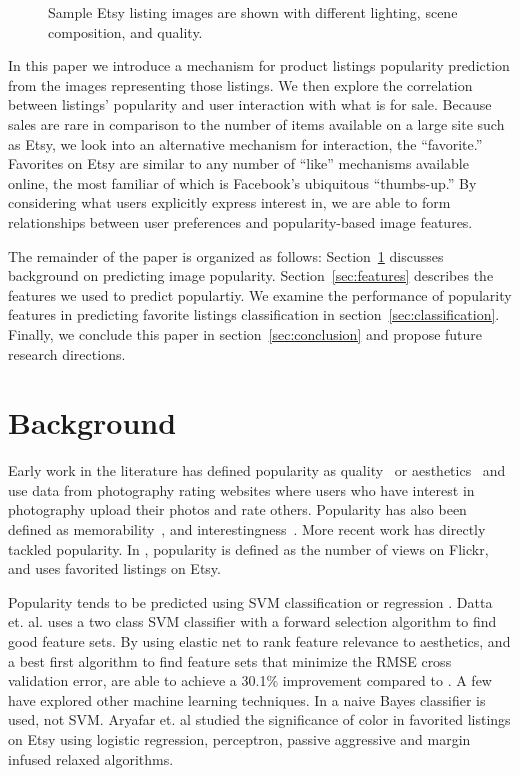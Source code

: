 \documentclass[conference,a4paper]{IEEEtran}
\begin{document}
\begin{figure}
  \caption{
  Sample Etsy listing images are shown with different lighting, scene composition, and quality.
  }
  \label{fig:etsylistings}
\end{figure}


In this paper we introduce a mechanism for product listings popularity prediction from the images representing those listings. We then explore the correlation between listings' popularity and user interaction with what is for sale. Because sales are rare in comparison to the number of items available on a large site such as Etsy, we look into an alternative mechanism for interaction, the ``favorite.'' Favorites on Etsy are similar to any number of ``like'' mechanisms available online, the most familiar of which is Facebook's ubiquitous ``thumbs-up.'' By considering what users explicitly express interest in, we are able to form relationships between user preferences and popularity-based image features. 
 
The remainder of the paper is organized as follows:
Section~\ref{sec:background} discusses background on predicting image popularity.
Section~\ref{sec:features} describes the features we used to predict populartiy.  We examine the
performance of popularity features in predicting favorite listings classification in
section~\ref{sec:classification}. Finally, we conclude this paper in
section~\ref{sec:conclusion} and propose future research directions.


\section{Background}
\label{sec:background}
Early work in the literature has defined popularity as quality~\cite{ke2006design} or aesthetics~\cite{datta2006studying} and use data from photography rating websites where users who have interest in photography upload their photos and rate others.  Popularity has also been defined as memorability~\cite{isola2011makes}, and interestingness~\cite{dhar2011high,gygli2013interestingness}.  More recent work has directly tackled popularity.  In \cite{khosla2014makes}, popularity is defined as the number of views on Flickr, and \cite{aryafar2014exploring} uses favorited listings on Etsy.

Popularity tends to be predicted using SVM classification or regression \cite{datta2006studying} \cite{khosla2014makes} \cite{chen2014aesthetic} \cite{wang2015automatic}.  Datta et. al. \cite{datta2006studying} uses a two class SVM classifier with a forward selection algorithm to find good feature sets.  By using elastic net to rank feature relevance to aesthetics, and a best first algorithm to find feature sets that minimize the RMSE cross validation error, \cite{wang2015automatic} are able to achieve a 30.1\% improvement compared to \cite{chen2014aesthetic}.  A few have explored other machine learning techniques.  In \cite{ke2006design} a naive Bayes classifier is used, not SVM.  Aryafar et. al \cite{aryafar2014exploring} studied the significance of color in favorited listings on Etsy using logistic regression, perceptron, passive aggressive and margin infused relaxed algorithms.
\end{document}
